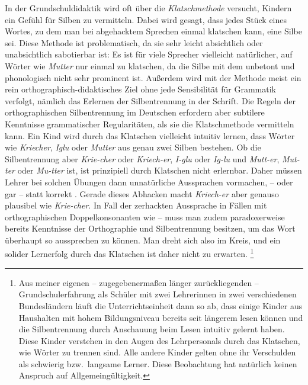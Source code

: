 In der Grundschuldidaktik wird oft über die \textit{Klatschmethode} versucht, Kindern ein Gefühl für Silben zu vermitteln.
Dabei wird gesagt, dass jedes Stück eines Wortes, zu dem man bei abgehacktem Sprechen einmal klatschen kann, eine Silbe sei.
Diese Methode ist problematisch, da sie sehr leicht absichtlich oder unabsichtlich sabotierbar ist:
Es ist für viele Sprecher vielleicht natürlicher, auf Wörter wie \textit{Mutter} \textipa{[mUt5]} nur einmal zu klatschen, da die Silbe mit dem \textipa{[5]} unbetont und phonologisch nicht sehr prominent ist.
Außerdem wird mit der Methode meist ein rein orthographisch-didaktisches Ziel ohne jede Sensibilität für Grammatik verfolgt, nämlich das Erlernen der Silbentrennung in der Schrift.
Die Regeln der orthographischen Silbentrennung im Deutschen erfordern aber subtilere Kenntnisse grammatischer Regularitäten, als sie die Klatschmethode vermitteln kann.
Ein Kind wird durch das Klatschen vielleicht intuitiv lernen, dass Wörter wie \textit{Kriecher}, \textit{Iglu} oder \textit{Mutter} aus genau zwei Silben bestehen.
Ob die Silbentrennung aber \textit{Krie-cher} oder \textit{Kriech-er}, \textit{I-glu} oder \textit{Ig-lu} und \textit{Mutt-er}, \textit{Mut-ter} oder \textit{Mu-tter} ist, ist prinzipiell durch Klatschen nicht erlernbar.
Daher müssen Lehrer bei solchen Übungen dann unnatürliche Aussprachen vormachen, \zB \textipa{[mUt]} -- \textipa{[ta]} oder gar \textipa{[mUt]} -- \textipa{[tEK]} statt korrekt \textipa{[mUt5]}.
Gerade dieses Abhacken macht \textit{Kriech-er} aber genauso plausibel wie \textit{Krie-cher}.
In Fall der zerhackten Aussprache in Fällen mit orthographischen Doppelkonsonanten wie \textipa{[mUt]} -- \textipa{[ta]} muss man zudem paradoxerweise bereits Kenntnisse der Orthographie und Silbentrennung besitzen, um das Wort überhaupt so aussprechen zu können.
Man dreht sich also im Kreis, und ein solider Lernerfolg durch das Klatschen ist daher nicht zu erwarten.%
\footnote{Aus meiner eigenen -- zugegebenermaßen länger zurückliegenden -- Grundschulerfahrung als Schüler mit zwei Lehrerinnen in zwei verschiedenen Bundesländern läuft die Unterrichtseinheit dann so ab, dass einige Kinder aus Haushalten mit hohem Bildungsniveau bereits seit längerem lesen können und die Silbentrennung durch Anschauung beim Lesen intuitiv gelernt haben.
Diese Kinder verstehen in den Augen des Lehrpersonals durch das Klatschen, wie Wörter zu trennen sind.
Alle andere Kinder gelten ohne ihr Verschulden als schwierig bzw.\ langsame Lerner.
Diese Beobachtung hat natürlich keinen Anspruch auf Allgemeingültigkeit.}

